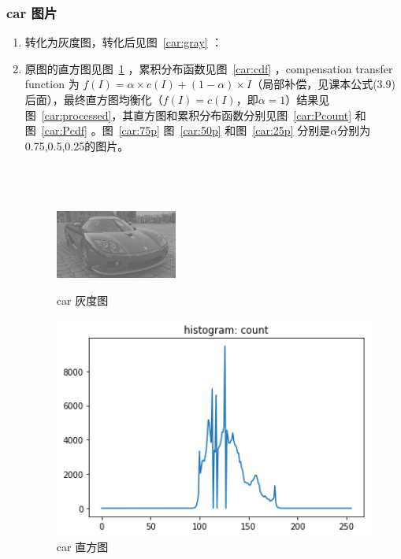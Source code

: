 \documentclass[a4paper,UTF8]{article}
\numberwithin{equation}{section}
\begin{document}
\subsubsection{car 图片}
\begin{enumerate}[(\romannumeral1)]
	\item 转化为灰度图，转化后见图~\ref{car:gray} ：
	\item 原图的直方图见图~\ref{car:count} ，累积分布函数见图~\ref{car:cdf}  ，compensation transfer function 为 $f(I)=\alpha×c(I)+(1-\alpha)×I$（局部补偿，见课本公式(3.9)后面），最终直方图均衡化（$f(I)=c(I)，即\alpha=1$）结果见图~\ref{car:processed}，其直方图和累积分布函数分别见图~\ref{car:Pcount} 和图~\ref{car:Pcdf} 。图~\ref{car:75p} 图~\ref{car:50p} 和图~\ref{car:25p} 分别是$\alpha$分别为0.75,0.5,0.25的图片。\\
	\\
	\\
	\\
\begin{figure}[t]
\centering
\begin{minipage}[t]{0.30\textwidth}
\centering
\includegraphics[width=4cm]{car_gray.jpg}
\caption{car 灰度图}
\label{car:gray}
\end{minipage}
\centering
\begin{minipage}[t]{0.3\textwidth}
\centering
\includegraphics[width=1.0\textwidth]{car_count.png}
\caption{car 直方图}
\label{car:count}
\end{minipage}

\end{figure}
\end{enumerate}
\end{document}
